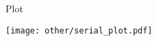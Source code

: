 \begin{frame}
  \begin{block}{Plot}\pause
\begin{center}
  \texttt{[image: other/serial\_plot.pdf]}
\end{center}
\end{block}
\end{frame}